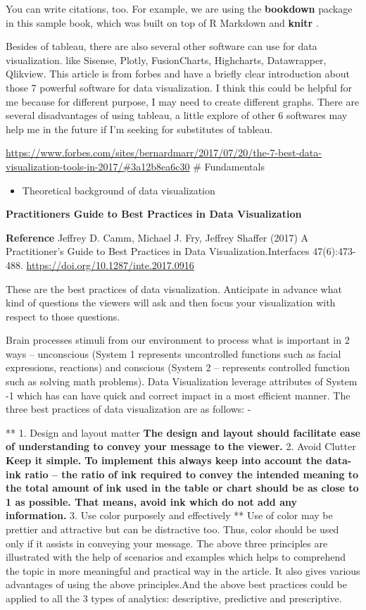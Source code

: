 \documentclass[]{book}
\providecommand{\tightlist}{%
  \setlength{\itemsep}{0pt}\setlength{\parskip}{0pt}}
\theoremstyle{definition}
\theoremstyle{definition}
\theoremstyle{definition}
\theoremstyle{remark}
\begin{document}
You can write citations, too. For example, we are using the
\textbf{bookdown} package \citep{R-bookdown} in this sample book, which
was built on top of R Markdown and \textbf{knitr} \citep{xie2015}.

Besides of tableau, there are also several other software can use for
data visualization. like Sisense, Plotly, FusionCharts, Highcharts,
Datawrapper, Qlikview. This article is from forbes and have a briefly
clear introduction about those 7 powerful software for data
visualization. I think this could be helpful for me because for
different purpose, I may need to create different graphs. There are
several disadvantages of using tableau, a little explore of other 6
softwares may help me in the future if I'm seeking for substitutes of
tableau.

\url{https://www.forbes.com/sites/bernardmarr/2017/07/20/the-7-best-data-visualization-tools-in-2017/\#3a12b8ea6c30}
\# Fundamentals

\begin{itemize}
\tightlist
\item
  Theoretical background of data visualization
\end{itemize}

\textbf{Practitioners Guide to Best Practices in Data Visualization}

\textbf{Reference} Jeffrey D. Camm, Michael J. Fry, Jeffrey Shaffer
(2017) A Practitioner's Guide to Best Practices in Data
Visualization.Interfaces 47(6):473-488.
\url{https://doi.org/10.1287/inte.2017.0916}

These are the best practices of data visualization. Anticipate in
advance what kind of questions the viewers will ask and then focus your
visualization with respect to those questions.

Brain processes stimuli from our environment to process what is
important in 2 ways -- unconscious (System 1 represents uncontrolled
functions such as facial expressions, reactions) and conscious (System 2
-- represents controlled function such as solving math problems). Data
Visualization leverage attributes of System -1 which has can have quick
and correct impact in a most efficient manner. The three best practices
of data visualization are as follows: -

** 1. Design and layout matter \textbf{ The design and layout should
facilitate ease of understanding to convey your message to the viewer. }
2. Avoid Clutter \textbf{ Keep it simple. To implement this always keep
into account the data-ink ratio -- the ratio of ink required to convey
the intended meaning to the total amount of ink used in the table or
chart should be as close to 1 as possible. That means, avoid ink which
do not add any information. } 3. Use color purposely and effectively **
Use of color may be prettier and attractive but can be distractive too.
Thus, color should be used only if it assists in conveying your message.
The above three principles are illustrated with the help of scenarios
and examples which helps to comprehend the topic in more meaningful and
practical way in the article. It also gives various advantages of using
the above principles.And the above best practices could be applied to
all the 3 types of analytics: descriptive, predictive and prescriptive.
\end{document}
